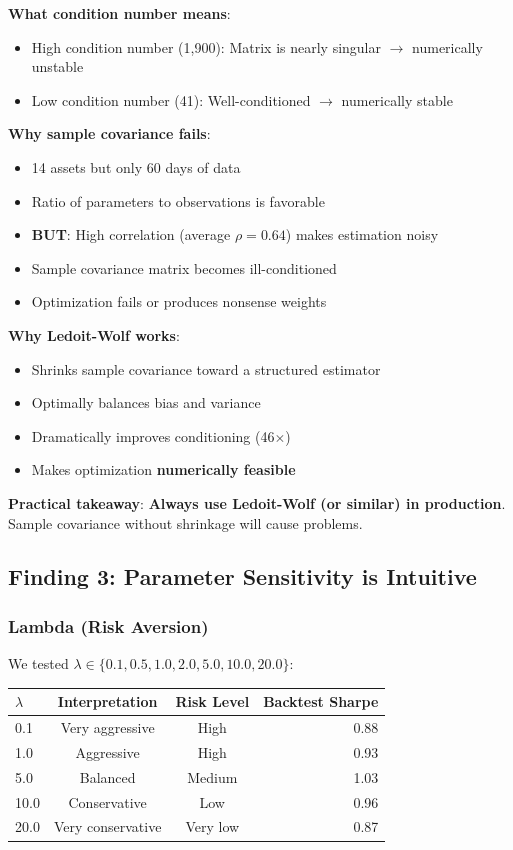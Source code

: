 \documentclass[a4paper,12pt]{article}
\begin{document}
\textbf{What condition number means}:
\begin{itemize}
    \item High condition number (1,900): Matrix is nearly singular $\rightarrow$ numerically unstable
    \item Low condition number (41): Well-conditioned $\rightarrow$ numerically stable
\end{itemize}

\textbf{Why sample covariance fails}:
\begin{itemize}
    \item 14 assets but only 60 days of data
    \item Ratio of parameters to observations is favorable
    \item \textbf{BUT}: High correlation (average $\rho=0.64$) makes estimation noisy
    \item Sample covariance matrix becomes ill-conditioned
    \item Optimization fails or produces nonsense weights
\end{itemize}

\textbf{Why Ledoit-Wolf works}:
\begin{itemize}
    \item Shrinks sample covariance toward a structured estimator
    \item Optimally balances bias and variance
    \item Dramatically improves conditioning (46$\times$)
    \item Makes optimization \textbf{numerically feasible}
\end{itemize}

\textbf{Practical takeaway}: \textbf{Always use Ledoit-Wolf (or similar) in production}. Sample covariance without shrinkage will cause problems.

\subsection{Finding 3: Parameter Sensitivity is Intuitive}

\subsubsection{Lambda (Risk Aversion)}

We tested $\lambda \in \{0.1, 0.5, 1.0, 2.0, 5.0, 10.0, 20.0\}$:

\begin{table}[H]
\centering
\begin{tabular}{lccr}
\toprule
\textbf{$\lambda$} & \textbf{Interpretation} & \textbf{Risk Level} & \textbf{Backtest Sharpe} \\
\midrule
0.1 & Very aggressive & High & 0.88 \\
1.0 & Aggressive & High & 0.93 \\
5.0 & Balanced & Medium & 1.03 \\
10.0 & Conservative & Low & 0.96 \\
20.0 & Very conservative & Very low & 0.87 \\
\bottomrule
\end{tabular}
\end{table}
\end{document}

